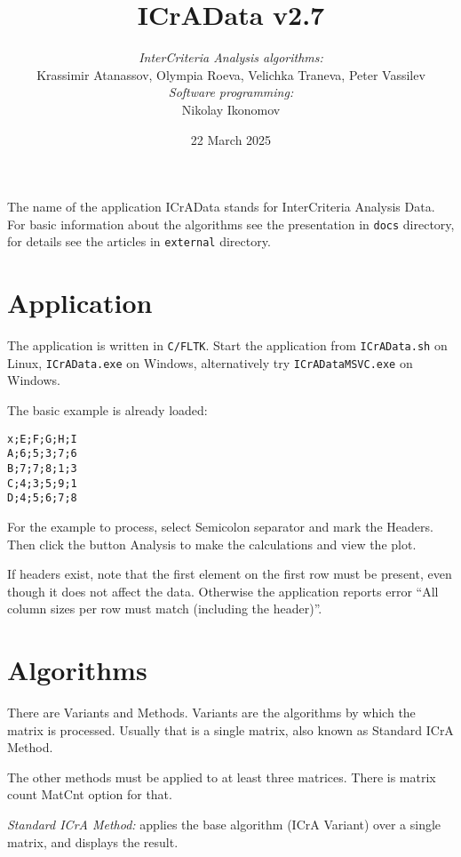 \documentclass[11pt, a4paper]{article}
\begin{document}
\title{\textbf{ICrAData v2.7}}
\author{\textit{InterCriteria Analysis algorithms:}\\
Krassimir Atanassov, Olympia Roeva, Velichka Traneva, Peter Vassilev\\
\textit{Software programming:}\\
Nikolay Ikonomov}
\date{22 March 2025}
\maketitle


\newpage
The name of the application ICrAData stands for InterCriteria Analysis Data.
For basic information about the algorithms see the presentation in \verb|docs| directory,
for details see the articles in \verb|external| directory.


\section{Application}

The application is written in \verb|C/FLTK|.
Start the application from \verb|ICrAData.sh| on Linux, \verb|ICrAData.exe| on Windows,
alternatively try \verb|ICrADataMSVC.exe| on Windows.

The basic example is already loaded:
\begin{verbatim}
x;E;F;G;H;I
A;6;5;3;7;6
B;7;7;8;1;3
C;4;3;5;9;1
D;4;5;6;7;8
\end{verbatim}
For the example to process, select Semicolon separator and mark the Headers.
Then click the button Analysis to make the calculations and view the plot.

If headers exist, note that the first element on the first row must be present, even though it does not affect the data.
Otherwise the application reports error ``All column sizes per row must match (including the header)''.


\section{Algorithms}

There are Variants and Methods. Variants are the algorithms by which the matrix is processed.
Usually that is a single matrix, also known as Standard ICrA Method.

The other methods must be applied to at least three matrices. There is matrix count MatCnt option for that.

\medskip
\textit{Standard ICrA Method:} applies the base algorithm (ICrA Variant) over a single matrix, and displays the result.
\end{document}
